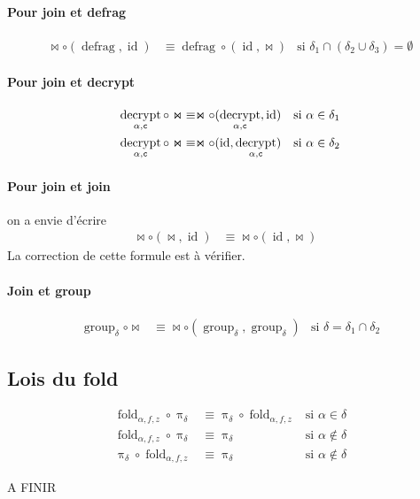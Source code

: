 \documentclass[french]{article}
\DeclareMathOperator{\proj}{\pi}
\DeclareMathOperator{\defrag}{defrag}
\DeclareMathOperator{\decrypt}{decrypt}
\DeclareMathOperator{\group}{group}
\DeclareMathOperator{\id}{id}
\newcommand\typeT[1]{\text{\ttfamily #1}}
\newcommand{\decryptArgs}[2]{\decrypt_{#1 , \typeT{#2}}}
\newcommand{\projDelta}{\proj_{\delta}}
\newcommand{\decryptCAlpha}{\decryptArgs{\alpha}{c}}
\newcommand{\groupDelta}{\group_{\delta}}
\newcommand{\fold}[3]{\operatorname{fold}_{#1, #2, #3}}
\newcommand{\foldAlphafz}{\fold{\alpha}{f}{z}}
\begin{document}
\paragraph{Pour join et defrag} 
\begin{align}
\Join \circ (\defrag, \id)
& \equiv
 \defrag \circ (\id, \Join)
& \text{si $\delta_1 \cap (\delta_2 \cup \delta_3) = \emptyset$}
\end{align}

\paragraph{Pour join et decrypt}
\begin{align}
\decryptCAlpha \circ \Join
& \equiv
\Join \circ (\decryptCAlpha, \id)
& \text{si $\alpha \in \delta_1$} \\
\decryptCAlpha \circ \Join
& \equiv
\Join \circ (\id, \decryptCAlpha)
& \text{si $\alpha \in \delta_2$} 
\end{align}

\paragraph{Pour join et join} on a envie d'écrire
\begin{align}
\Join \circ (\Join, \id)
& \equiv \Join \circ (\id, \Join) &
\end{align}
La correction de cette formule est à vérifier.

\paragraph{Join et group}
\begin{align}
\groupDelta \circ \Join
& \equiv \Join \circ (\groupDelta, \groupDelta)
& \text{si $\delta = \delta_1 \cap \delta_2$}
\end{align}


\subsection*{Lois du fold}
\begin{align}
\foldAlphafz \circ \projDelta
& \equiv \projDelta \circ \foldAlphafz
& \text{si $\alpha \in \delta$} \\
\foldAlphafz \circ \projDelta
& \equiv \projDelta
& \text{si $\alpha \notin \delta$} \\
\projDelta \circ \foldAlphafz
& \equiv \projDelta
& \text{si $\alpha \notin \delta$}
\end{align}



A FINIR
\end{document}
